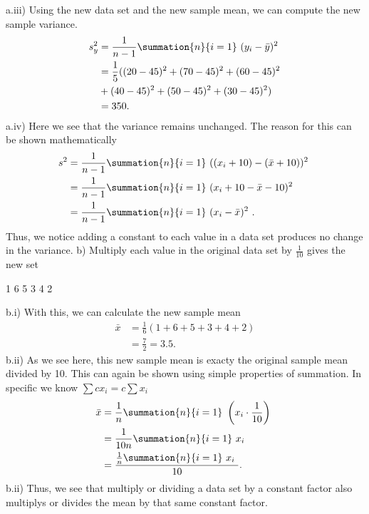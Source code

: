 \documentclass{report}
\begin{document}
    \bigbreak \noindent 
    a.iii) Using the new data set and the new sample mean, we can compute the new sample variance.
    \begin{align*}
        s_{y}^{2} &= \frac{1}{n-1}\summation{n}{i=1}\ (y_{i} - \bar{y})^{2}\ \\
                  &= \frac{1}{5}((20-45)^{2} + (70-45)^{2} + (60-45)^{2}  \\
                  &+ (40-45)^{2} + (50-45)^{2} + (30-45)^{2}) \\
                  &=350
    .\end{align*}
    \bigbreak \noindent 
    a.iv) Here we see that the variance remains unchanged. The reason for this can be shown mathematically
    \begin{align*}
        s^{2}&=\frac{1}{n-1}\summation{n}{i=1}\ ((x_{i} + 10) - (\bar{x} +10))^{2}\ \\
        &=\frac{1}{n-1}\summation{n}{i=1}\ (x_{i}+10-\bar{x}-10)^{2}\ \\
        &=\frac{1}{n-1}\summation{n}{i=1}\ (x_{i}-\bar{x})^{2}\
    .\end{align*}
    \bigbreak \noindent 
    Thus, we notice adding a constant to each value in a data set produces no change in the variance.
    \bigbreak \noindent 
    b) Multiply each value in the original data set by $\frac{1}{10}$ gives the new set
    \begin{center}
        1 6 5 3 4 2
    \end{center}
    \bigbreak \noindent 
    b.i) With this, we can calculate the new sample mean
    \begin{align*}
        \bar{x} &= \frac{1}{6}(1+6+5+3+4+2) \\
        &=\frac{7}{2} =3.5
    .\end{align*}
    \bigbreak \noindent 
    b.ii) As we see here, this new sample mean is exacty the original sample mean divided by 10. This can again be shown using simple properties of summation. In specific we know $\sum cx_{i} = c\sum x_{i}$ 
    \begin{align*}
        \bar{x} &= \frac{1}{n}\summation{n}{i=1}\ \left(x_{i}\cdot \frac{1}{10}\right)\  \\
       &=\frac{1}{10n}\summation{n}{i=1}\ x_{i}\ \\
       &= \frac{\frac{1}{n}\summation{n}{i=1}\ x_{i}\ }{10}
    .\end{align*}
    \bigbreak \noindent 
    b.ii) Thus, we see that multiply or dividing a data set by a constant factor also multiplys or divides the mean by that same constant factor.
\end{document}

